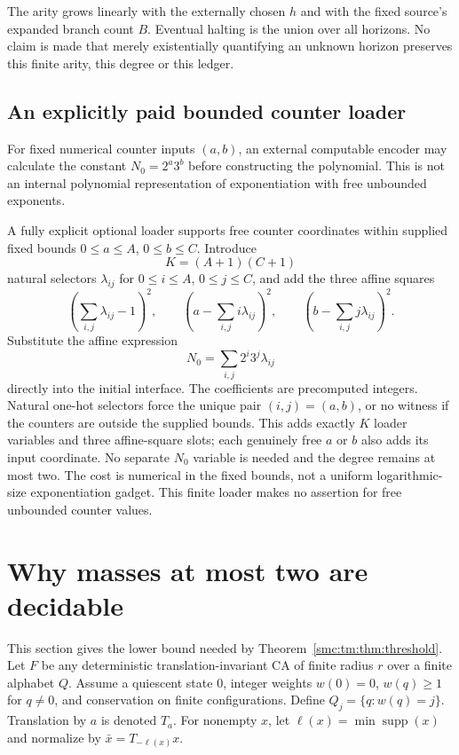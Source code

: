 \documentclass[11pt,letterpaper]{article}
\numberwithin{equation}{section}
\theoremstyle{definition}
\theoremstyle{remark}
\newcommand{\supp}{\operatorname{supp}}
\begin{document}
The arity grows linearly with the externally chosen $h$ and with the fixed source's expanded branch count $B$. Eventual halting is the union over all horizons. No claim is made that merely existentially quantifying an unknown horizon preserves this finite arity, this degree or this ledger.

\subsection{An explicitly paid bounded counter loader}

For fixed numerical counter inputs $(a,b)$, an external computable encoder may calculate the constant $N_0=2^a3^b$ before constructing the polynomial. This is not an internal polynomial representation of exponentiation with free unbounded exponents.

A fully explicit optional loader supports free counter coordinates within supplied fixed bounds $0\le a\le A$, $0\le b\le C$. Introduce
\[
K=(A+1)(C+1)
\]
natural selectors $\lambda_{ij}$ for $0\le i\le A$, $0\le j\le C$, and add the three affine squares
\[
\left(\sum_{i,j}\lambda_{ij}-1\right)^2,
\qquad\left(a-\sum_{i,j}i\lambda_{ij}\right)^2,
\qquad\left(b-\sum_{i,j}j\lambda_{ij}\right)^2.
\]
Substitute the affine expression
\[
N_0=\sum_{i,j}2^i3^j\lambda_{ij}
\]
directly into the initial interface. The coefficients are precomputed integers. Natural one-hot selectors force the unique pair $(i,j)=(a,b)$, or no witness if the counters are outside the supplied bounds. This adds exactly $K$ loader variables and three affine-square slots; each genuinely free $a$ or $b$ also adds its input coordinate. No separate $N_0$ variable is needed and the degree remains at most two. The cost is numerical in the fixed bounds, not a uniform logarithmic-size exponentiation gadget. This finite loader makes no assertion for free unbounded counter values.


\section{Why masses at most two are decidable}\label{smc:tm:sec:lower}

This section gives the lower bound needed by Theorem~\ref{smc:tm:thm:threshold}. Let $F$ be any deterministic translation-invariant CA of finite radius $r$ over a finite alphabet $Q$. Assume a quiescent state $0$, integer weights $w(0)=0$, $w(q)\ge1$ for $q\ne0$, and conservation on finite configurations. Define $Q_j=\{q:w(q)=j\}$. Translation by $a$ is denoted $T_a$. For nonempty $x$, let $\ell(x)=\min\supp(x)$ and normalize by $\bar x=T_{-\ell(x)}x$.
\end{document}
